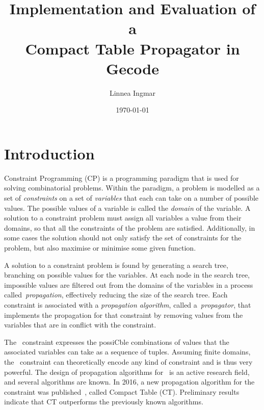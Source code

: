 \documentclass[a4paper,11pt]{article}
\title{\textbf{Implementation and Evaluation of a\\
    Compact Table Propagator in Gecode
  }
}
\author{Linnea Ingmar} %
\date{\today}
\newcommand{\Table}{\Constraint{Table}}
\newcommand{\CTpaper}[0]{DBLP:conf/cp/DemeulenaereHLP16}
\numberwithin{equation}{section}
\begin{document}
\maketitle

\tableofcontents

\newpage

\section{Introduction}
\label{intro}


Constraint Programming (CP) is a programming paradigm that is used for solving
combinatorial problems. Within the paradigm, a problem is
modelled as a set of \emph{constraints} on a
set of \emph{variables} that each can take on a number of
possible values. The possible values of 
a variable is called the \emph{domain} of the variable.
A solution to a constraint problem must assign all variables
a value from their domains, so that all the constraints of the problem
are satisfied. Additionally, in some cases the solution should not only
satisfy the set of constraints for the
problem, but also maximise or minimise some given function.


A solution to a constraint problem is found by generating a search
tree, branching on possible values for the variables. At each node
in the search tree, impossible values are filtered out from the domains
of the variables in a process called~\emph{propagation}, effectively
reducing the size of the search tree.
Each constraint is associated with a \emph{propagation algorithm},
called a~\emph{propagator},
that implements the propagation for that constraint by removing
values from the variables that are in conflict with the constraint.

The \Table~constraint expresses the possiCble combinations of values
that the associated variables can take as a sequence of tuples.
Assuming finite domains, the \Table~constraint can theoretically
encode any kind of constraint and is thus very powerful. 
The design of propagation algorithms for \Table~is an active research field,
and several algorithms are known. In 2016, a new propagation algorithm for the \Table
constraint was published~\cite{\CTpaper}, called Compact Table (CT).
Preliminary results indicate that CT outperforms the previously known algorithms.
\end{document}
